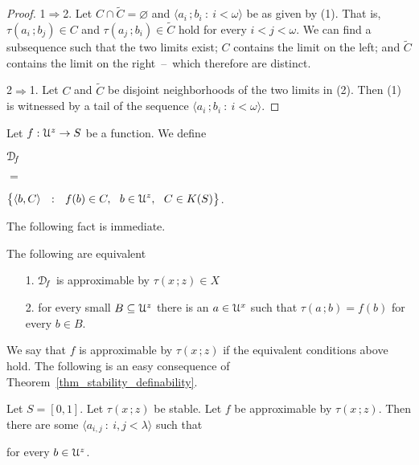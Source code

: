   \noindent\llap{\textcolor{red}{\Large\warning}\kern1.5ex}\ignorespaces%
  \vspace{-\baselineskip-\parskip}
\begin{proof}
  1$\Rightarrow$2.
  Let $C\cap\tilde C=\varnothing$ and $\langle a_i\,;b_i\ :\ i<\omega\rangle$ be as given by (1).
  That is, $\tau(a_i\,;b_j)\in C$ and $\tau(a_j\,;b_i)\in \tilde C$ hold for every $i<j<\omega$.
  We can find a subsequence such that the two limits exist; $C$ contains the limit on the left; and $\tilde C$ contains the limit on the right~--~which therefore are distinct.%

  2$\Rightarrow$1. Let $C$ and $\tilde C$ be disjoint neighborhoods of the two limits in (2).
  Then (1) is witnessed by a tail of the sequence $\langle a_i\,;b_i\ :\ i<\omega\rangle$.
\end{proof}


Let $f:{\EuScript U}^{z}\to S$ be a function.
We define
{\def\medrel#1{\parbox{5ex}{\hfil $#1$}}
\def\ceq#1#2#3{\parbox[t]{15ex}{$\displaystyle #1$}\medrel{#2}{$\displaystyle #3$}}

\ceq{\hfill{\EuScript D\!}_f}{=}{\big\{\langle b,C\rangle\ \ :\ \ f(b)\in C,\ \ b\in{\EuScript U}^{z},\ \ C\in K(S)\big\}}.}


The following fact is immediate.

\begin{fact}
  The following are equivalent
  \begin{itemize}
    \item [1.] ${\EuScript D\!}_f$ is approximable by $\tau(x\,;z)\in X$
    \item [2.] for every small $B\subseteq{\EuScript U}^z$ there is an $a\in{\EuScript U}^x$ such that $\tau(a\,;b)=f(b)$ for every $b\in B$.\smallskip
  \end{itemize}
\end{fact}

We say that $f$ is approximable by $\tau(x\,;z)$ if the equivalent conditions above hold.
The following is an easy consequence of Theorem~\ref{thm_stability_definability}.

\begin{theorem}
  Let $S=[0,1]$.
  Let $\tau(x\,;z)$ be stable.
  Let $f$ be approximable by $\tau(x\,;z)$.
  Then there are some $\langle a_{i,j}\ :\ i,j<\lambda\rangle$ such that \smallskip

  \hfill for every $b\in{\EuScript U}^z$.
  
\end{theorem}


